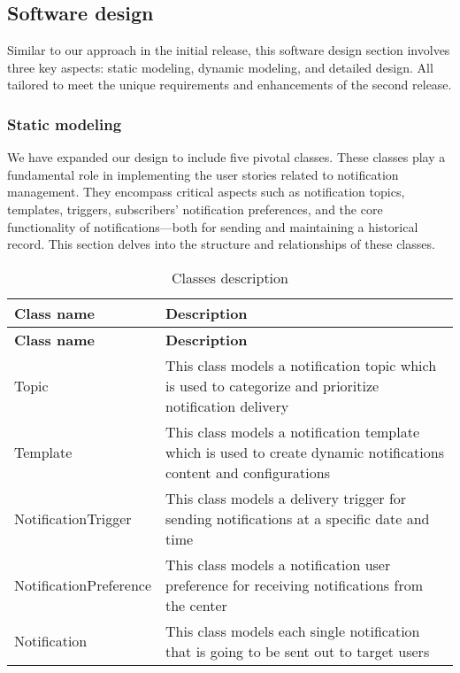 \subsection{Software design}
Similar to our approach in the initial release, this software design section involves three key aspects:
static modeling, dynamic modeling, and detailed design. All tailored to meet the unique requirements and
enhancements of the second release.

\subsubsection{Static modeling}
We have expanded our design to include five pivotal classes. These classes play a fundamental role in
implementing the user stories related to notification management. They encompass critical aspects such
as notification topics, templates, triggers, subscribers' notification preferences, and the core functionality of
notifications—both for sending and maintaining a historical record. This section delves into the structure
and relationships of these classes. \\

\begin{longtable}{ | m{} | m{} | }
    \caption{Classes description}                                                                                                               \\
    \hline
    \textbf{Class name}    & \textbf{Description}                                                                                               \\
    \hline
    \endfirsthead
    \hline
    \textbf{Class name}    & \textbf{Description}                                                                                               \\
    \hline
    \endhead
    \endfoot
    \hline
    \endlastfoot
    Topic                  & This class models a notification topic which is used to categorize and prioritize notification delivery            \\
    \hline
    Template               & This class models a notification template which is used to create dynamic notifications content and configurations \\
    \hline
    NotificationTrigger    & This class models a delivery trigger for sending notifications at a specific date and time                         \\
    \hline
    NotificationPreference & This class models a notification user preference for receiving notifications from the center                       \\
    \hline
    Notification           & This class models each single notification that is going to be sent out to target users                            \\
    \hline
\end{longtable}

